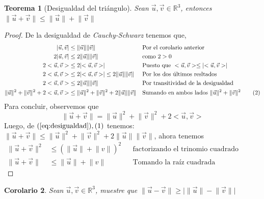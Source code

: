 \documentclass[letterpaper]{article}
\providecommand{\abs}[1]{\lvert#1\rvert}
\providecommand{\norm}[1]{\lVert#1\rVert}
\providecommand{\pint}[1]{<#1>}
\newcommand{\R}{\mathds{R}}
\renewcommand{\u}{\vec{u}}
\renewcommand{\v}{\vec{v}}
\renewcommand{\*}{\cdot}
\newtheorem{theorem}{Teorema}[section]
\newtheorem{corolario}[theorem]{Corolario}
\theoremstyle{definition}
\begin{document}
\newpage
\begin{theorem}[Desigualdad del triángulo]
	Sean $ \u, \v  \in \R^3$, entonces $ \norm{\u + \v} \leq \norm{\u} + \norm{\v} $
\end{theorem}
\begin{proof}
	De la desigualdad de \textit{ Cauchy-Schwarz} tenemos que, 
	\begin{align*}
		\abs{\u, \v} &\leq \norm{\u} \norm{\v} && \text{Por el corolario anterior}\\
		2\abs{\u, \v} &\leq 2\norm{\u} \norm{\v} && \text{como $ 2> 0 $}\\
		2\pint{\u, \v} &\leq 2 \abs{\pint{\u, \v}} && \text{Puesto que } \pint{\u, \v} \leq \abs{\pint{\u, \v}}\\
		2\pint{\u, \v} &\leq 2 \abs{\pint{\u, \v}} \leq  2\norm{\u}\norm{\v}  && \text{Por los dos últimos resltados}\\
		2\pint{\u, \v} &\leq  2\norm{\u}\norm{\v}  && \text{Por transitividad de la desigualdad }\\
		\norm{\u}^2 + \norm{\v}^2 + 2\pint{\u, \v} &\leq \norm{\u}^2 + \norm{\v}^2 + 2\norm{\u}\norm{\v}  && \text{Sumando en ambos lados } \norm{\u}^2 + \norm{\v}^2 \label{eq:desigualdad} \tag{2}\\
	\end{align*}
	Para concluir, observemos que $$ \norm{\u + \v} = \norm{\u}^2 + \norm{\v}^2 + 2 \pint{\u, \v} \label{eq:definicionInterno} \label{3} $$
	Luego, de $ (\ref{eq:desigualdad}), (1) $ tenemos: 
	$ \norm{\u + \v} \leq \norm{\u}^2 + \norm{\v}^2 + 2 \norm{\u} \norm{\v} $, ahora tenemos 
	\begin{align*}
	\norm{\u+ \v}^2 & \leq (\norm{\u} + \norm{v})^2 && \text{factorizando el trinomio cuadrado pefecto}\\
	\norm{\u+ \v} & \leq \norm{\u} + \norm{v} && \text{Tomando la raíz cuadrada}
	\end{align*}
\end{proof}
\begin{corolario}
	Sean $ \u, \v \in \R^3 $, muestre que $ \norm{\u - \v} \geq \abs{\norm{\u} - \norm{\v}} $
\end{corolario}
\end{document}
